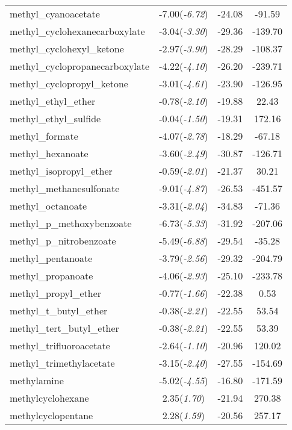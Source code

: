 \documentclass{amsart}
\begin{document}
\begin{center}
\begin{longtable}{l|c|c|c}
methyl\_cyanoacetate & -7.00(\textit{-6.72}) & -24.08 & -91.59 \\ 
methyl\_cyclohexanecarboxylate & -3.04(\textit{-3.30}) & -29.36 & -139.70 \\ 
methyl\_cyclohexyl\_ketone & -2.97(\textit{-3.90}) & -28.29 & -108.37 \\ 
methyl\_cyclopropanecarboxylate & -4.22(\textit{-4.10}) & -26.20 & -239.71 \\ 
methyl\_cyclopropyl\_ketone & -3.01(\textit{-4.61}) & -23.90 & -126.95 \\ 
methyl\_ethyl\_ether & -0.78(\textit{-2.10}) & -19.88 & 22.43 \\ 
methyl\_ethyl\_sulfide & -0.04(\textit{-1.50}) & -19.31 & 172.16 \\ 
methyl\_formate & -4.07(\textit{-2.78}) & -18.29 & -67.18 \\ 
methyl\_hexanoate & -3.60(\textit{-2.49}) & -30.87 & -126.71 \\ 
methyl\_isopropyl\_ether & -0.59(\textit{-2.01}) & -21.37 & 30.21 \\ 
methyl\_methanesulfonate & -9.01(\textit{-4.87}) & -26.53 & -451.57 \\ 
methyl\_octanoate & -3.31(\textit{-2.04}) & -34.83 & -71.36 \\ 
methyl\_p\_methoxybenzoate & -6.73(\textit{-5.33}) & -31.92 & -207.06 \\ 
methyl\_p\_nitrobenzoate & -5.49(\textit{-6.88}) & -29.54 & -35.28 \\ 
methyl\_pentanoate & -3.79(\textit{-2.56}) & -29.32 & -204.79 \\ 
methyl\_propanoate & -4.06(\textit{-2.93}) & -25.10 & -233.78 \\ 
methyl\_propyl\_ether & -0.77(\textit{-1.66}) & -22.38 & 0.53 \\ 
methyl\_t\_butyl\_ether & -0.38(\textit{-2.21}) & -22.55 & 53.54 \\ 
methyl\_tert\_butyl\_ether & -0.38(\textit{-2.21}) & -22.55 & 53.39 \\ 
methyl\_trifluoroacetate & -2.64(\textit{-1.10}) & -20.96 & 120.02 \\ 
methyl\_trimethylacetate & -3.15(\textit{-2.40}) & -27.55 & -154.69 \\ 
methylamine & -5.02(\textit{-4.55}) & -16.80 & -171.59 \\ 
methylcyclohexane & 2.35(\textit{1.70}) & -21.94 & 270.38 \\ 
methylcyclopentane & 2.28(\textit{1.59}) & -20.56 & 257.17 \\ 

\end{longtable}
\end{center}
\end{document}
